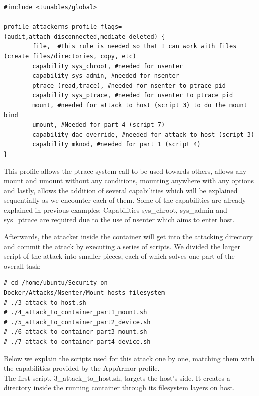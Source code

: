 \begin{lstlisting}[style=Dockerfile, caption={AppArmor profile attackerns\_profile}]
#include <tunables/global>

profile attackerns_profile flags=(audit,attach_disconnected,mediate_deleted) {
        file,  #This rule is needed so that I can work with files (create files/directories, copy, etc)
        capability sys_chroot, #needed for nsenter
        capability sys_admin, #needed for nsenter
        ptrace (read,trace), #needed for nsenter to ptrace pid
        capability sys_ptrace, #needed for nsenter to ptrace pid
        mount, #needed for attack to host (script 3) to do the mount bind
        umount, #Needed for part 4 (script 7)
        capability dac_override, #needed for attack to host (script 3)
        capability mknod, #needed for part 1 (script 4)
}
\end{lstlisting}

This profile allows the ptrace system call to be used towards others, allows any mount and umount without any conditions, mounting anywhere with any options and lastly, allows the addition of several capabilities which will be explained sequentially as we encounter each of them. Some of the capabilities are already explained in previous examples: Capabilities sys\_chroot, sys\_admin and sys\_ptrace
are required due to the use of nsenter which aims to enter host.

Afterwards, the attacker inside the container will get into the attacking directory and commit the attack by executing a series of scripts. We divided the larger script of the attack into smaller pieces, each of which solves one part of the overall task:

\begin{lstlisting}[style=dockercommands]
# cd /home/ubuntu/Security-on-Docker/Attacks/Nsenter/Mount_hosts_filesystem
# ./3_attack_to_host.sh
# ./4_attack_to_container_part1_mount.sh
# ./5_attack_to_container_part2_device.sh
# ./6_attack_to_container_part3_mount.sh
# ./7_attack_to_container_part4_device.sh
\end{lstlisting}

Below we explain the scripts used for this attack one by one, matching them with the capabilities provided by the AppArmor profile.
\\

The first script, 3\_attack\_to\_host.sh, targets the host's side. It creates a directory inside the running container through its filesystem layers on host.

